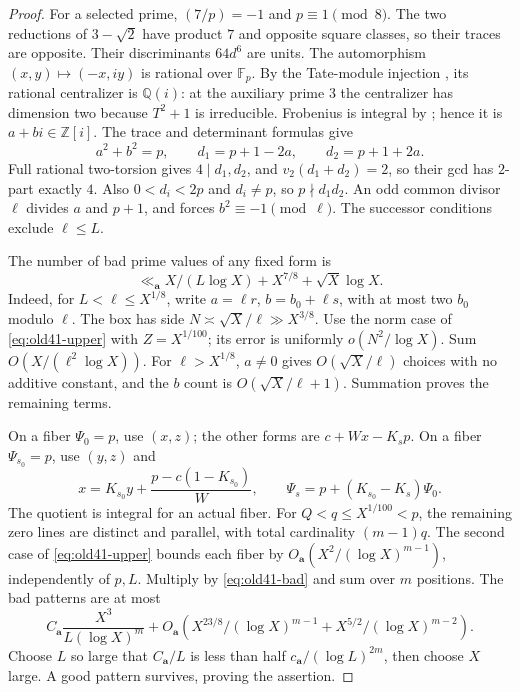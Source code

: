 \documentclass[11pt]{article}
\theoremstyle{definition}
\theoremstyle{remark}
\begin{document}
\begin{proof}
For a selected prime, $(7/p)=-1$ and $p\equiv1\pmod8$. The two
reductions of $3-\sqrt2$ have product $7$ and opposite square classes,
so their traces are opposite. Their discriminants $64d^6$ are units.
The automorphism $(x,y)\mapsto(-x,iy)$ is rational over $\mathbb F_p$.
By the Tate-module injection \cite[III.7.4]{silverman}, its rational
centralizer is $\mathbb Q(i)$: at the auxiliary prime $3$ the
centralizer has dimension two because $T^2+1$ is irreducible.
Frobenius is integral by \cite[V.2.3.1(b)]{silverman}; hence it is
$a+bi\in\mathbb Z[i]$. The trace and determinant formulas
\cite[III.8.6]{silverman} give
\[
 a^2+b^2=p,\qquad d_1=p+1-2a,\qquad d_2=p+1+2a.
\]
Full rational two-torsion gives $4\mid d_1,d_2$, and
$v_2(d_1+d_2)=2$, so their gcd has $2$-part exactly $4$.
Also $0<d_i<2p$ and $d_i\ne p$, so $p\nmid d_1d_2$.
An odd common divisor $\ell$ divides $a$ and $p+1$, and forces
$b^2\equiv-1\pmod\ell$. The successor conditions exclude $\ell\le L$.

The number of bad prime values of any fixed form is
\begin{equation}\label{eq:old41-bad}
 \ll_{\mathbf a}X/(L\log X)+X^{7/8}+\sqrt X\log X.
\end{equation}
Indeed, for $L<\ell\le X^{1/8}$, write
$a=\ell r$, $b=b_0+\ell s$, with at most two $b_0$ modulo $\ell$.
The box has side $N\asymp\sqrt X/\ell\gg X^{3/8}$.
Use the norm case of \eqref{eq:old41-upper} with $Z=X^{1/100}$;
its error is uniformly $o(N^2/\log X)$. Sum
$O(X/(\ell^2\log X))$. For $\ell>X^{1/8}$, $a\ne0$ gives
$O(\sqrt X/\ell)$ choices with no additive constant, and the
$b$ count is $O(\sqrt X/\ell+1)$. Summation proves the remaining terms.

On a fiber $\Psi_0=p$, use $(x,z)$; the other forms are
$c+Wx-K_s p$. On a fiber $\Psi_{s_0}=p$, use $(y,z)$ and
\[
 x=K_{s_0}y+\frac{p-c(1-K_{s_0})}{W},\qquad
 \Psi_s=p+(K_{s_0}-K_s)\Psi_0.
\]
The quotient is integral for an actual fiber. For
$Q<q\le X^{1/100}<p$, the remaining zero lines are distinct and
parallel, with total cardinality $(m-1)q$. The second case of
\eqref{eq:old41-upper} bounds each fiber by
$O_{\mathbf a}(X^2/(\log X)^{m-1})$, independently of $p,L$.
Multiply by \eqref{eq:old41-bad} and sum over $m$ positions.
The bad patterns are at most
\[
 C_{\mathbf a}\frac{X^3}{L(\log X)^m}
 +O_{\mathbf a}\left(
 X^{23/8}/(\log X)^{m-1}+X^{5/2}/(\log X)^{m-2}\right).
\]
Choose $L$ so large that $C_{\mathbf a}/L$ is less than half
$c_{\mathbf a}/(\log L)^{2m}$, then choose $X$ large.
A good pattern survives, proving the assertion.
\end{proof}
\end{document}
